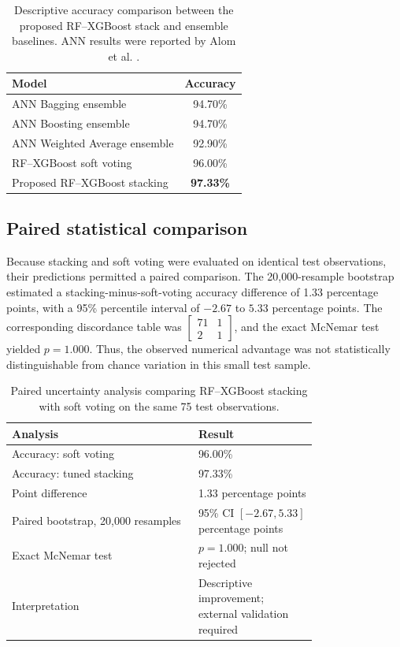 ﻿\documentclass[preprint,12pt]{elsarticle}
\begin{document}
\begin{table}[H]
\centering
\caption{Descriptive accuracy comparison between the proposed RF--XGBoost stack and ensemble baselines. ANN results were reported by Alom et al. \cite{alom2024}.}
\label{tab:basecomparison}
\small
\begin{tabularx}{0.74\linewidth}{@{}X c@{}}
\toprule
Model & Accuracy \\
\midrule
ANN Bagging ensemble & 94.70\% \\
ANN Boosting ensemble & 94.70\% \\
ANN Weighted Average ensemble & 92.90\% \\
RF--XGBoost soft voting & 96.00\% \\
Proposed RF--XGBoost stacking & \textbf{97.33\%} \\
\bottomrule
\end{tabularx}
\end{table}

\subsection{Paired statistical comparison}
Because stacking and soft voting were evaluated on identical test observations, their predictions permitted a paired comparison. The 20,000-resample bootstrap estimated a stacking-minus-soft-voting accuracy difference of 1.33 percentage points, with a 95\% percentile interval of $-2.67$ to $5.33$ percentage points. The corresponding discordance table was $\begin{bmatrix}71&1\\2&1\end{bmatrix}$, and the exact McNemar test yielded $p=1.000$. Thus, the observed numerical advantage was not statistically distinguishable from chance variation in this small test sample.

\begin{table}[H]
\centering
\caption{Paired uncertainty analysis comparing RF--XGBoost stacking with soft voting on the same 75 test observations.}
\label{tab:stats}
\small
\begin{tabular}{p{0.47\linewidth}p{0.30\linewidth}}
\toprule
Analysis & Result \\
\midrule
Accuracy: soft voting & 96.00\% \\
Accuracy: tuned stacking & 97.33\% \\
Point difference & 1.33 percentage points \\
Paired bootstrap, 20,000 resamples & 95\% CI $[-2.67,5.33]$ percentage points \\
Exact McNemar test & $p=1.000$; null not rejected \\
Interpretation & Descriptive improvement; external validation required \\
\bottomrule
\end{tabular}
\end{table}
\end{document}
